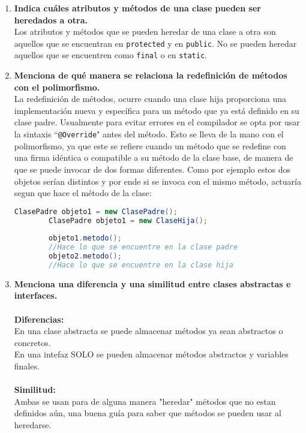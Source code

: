 \documentclass{article} %
\begin{document}
\begin{enumerate}
\item \textbf{Indica cuáles atributos y métodos de una clase pueden ser heredados a otra.}\\
    Los atributos y métodos que se pueden heredar de una clase a otra son aquellos que se 
    encuentran en \texttt{protected} y en \texttt{public}. No se pueden heredar aquellos que se
    encuentren como \texttt{final} o en \texttt{static}.
\item \textbf{Menciona de qué manera se relaciona la redefinición de métodos con el polimorfismo.}\\
    La redefinición de métodos, ocurre cuando una clase hija proporciona una implementación 
    nueva y específica para un método que ya está definido en su clase padre. Usualmente
    para evitar errores en el compilador se opta por usar la sintaxis ``\texttt{@Override}" antes
    del método. Esto se lleva de la mano con el polimorfismo, ya que este se refiere cuando
    un método que se redefine con una firma idéntica o compatible a su método de la clase base, de
    manera de que se puede invocar de dos formas diferentes. Como por ejemplo estos dos objetos
    serían distintos y por ende si se invoca con el mismo método, actuaría segun que hace el método
    de la clase:\\
    \begin{lstlisting}[language=Java, title={CÓDIGO EJEMPLO:}]
        ClasePadre objeto1 = new ClasePadre();
        ClasePadre objeto1 = new ClaseHija();
        
        objeto1.metodo();
        //Hace lo que se encuentre en la clase padre
        objeto2.metodo();
        //Hace lo que se encuentre en la clase hija

    \end{lstlisting}
    
\item \textbf{Menciona una diferencia y una similitud entre clases abstractas e interfaces.}\\\\
    \textbf{Diferencias:}\\
    En una clase abstracta se puede almacenar métodos ya sean abstractos o concretos.\\
    En una intefaz SOLO se pueden almacenar métodos abstractos y variables finales.\\\\
    \textbf{Similitud:}\\
    Ambas se usan para de alguna manera "heredar" métodos que no estan definidos aún, una
    buena guía para saber que métodos se pueden usar al heredarse.
\end{enumerate}
\end{document}
